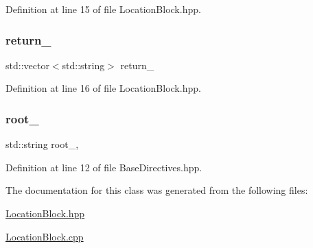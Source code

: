 Definition at line 15 of file Location\+Block.\+hpp.

\mbox{\label{classft_1_1_location_block_abab721f365aff66f8a1289de21c8f01f}} 
\subsubsection{\texorpdfstring{return\+\_\+}{return\_}}
{\footnotesize\ttfamily std\+::vector$<$std\+::string$>$ return\+\_\+\hspace{0.3cm}{\ttfamily [private]}}



Definition at line 16 of file Location\+Block.\+hpp.

\mbox{\label{classft_1_1_base_directives_abb1eaf0bba10b90172d6152e69457dc7}} 
\subsubsection{\texorpdfstring{root\+\_\+}{root\_}}
{\footnotesize\ttfamily std\+::string root\+\_\+\hspace{0.3cm}{\ttfamily [protected]}, {\ttfamily [inherited]}}



Definition at line 12 of file Base\+Directives.\+hpp.



The documentation for this class was generated from the following files\+:\begin{DoxyCompactItemize}
\item 
\hyperlink{_location_block_8hpp}{Location\+Block.\+hpp}\item 
\hyperlink{_location_block_8cpp}{Location\+Block.\+cpp}\end{DoxyCompactItemize}
